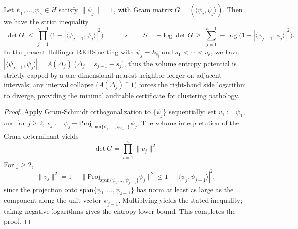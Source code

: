 \begin{proposition}\label{prop:xi-gram-det-nearest-neighbor-product-upper-bound}
Let \(\psi_1,\dots,\psi_\kappa\in H\) satisfy \(\|\psi_j\|=1\), with Gram matrix \(G=(\langle\psi_i,\psi_j\rangle)\).
Then we have the strict inequality
\[
\boxed{\;
\det G\ \le\ \prod_{j=1}^{\kappa-1}\bigl(1-|\langle\psi_{j+1},\psi_j\rangle|^2\bigr)\;}
\qquad
\Longrightarrow\qquad
S=-\log\det G\ \ge\ \sum_{j=1}^{\kappa-1}-\log\bigl(1-|\langle\psi_{j+1},\psi_j\rangle|^2\bigr).
\]
In the present Hellinger-RKHS setting with \(\psi_j=k_{s_j}\) and \(s_1<\cdots<s_\kappa\), we have \(|\langle\psi_{j+1},\psi_j\rangle|=A(\Delta_j)\) (\(\Delta_j=s_{j+1}-s_j\)), thus the volume entropy potential is strictly capped by a one-dimensional nearest-neighbor ledger on adjacent intervals; any interval collapse (\(A(\Delta_j)\uparrow 1\)) forces the right-hand side logarithm to diverge, providing the minimal auditable certificate for clustering pathology.
\end{proposition}
\begin{proof}
Apply Gram-Schmidt orthogonalization to \(\{\psi_j\}\) sequentially: set
\(
v_1:=\psi_1
\), and for \(j\ge 2\),
\(
v_j:=\psi_j-\mathrm{Proj}_{\mathrm{span}\{\psi_1,\dots,\psi_{j-1}\}}\psi_j
\).
The volume interpretation of the Gram determinant yields
\[
\det G=\prod_{j=1}^{\kappa}\|v_j\|^2.
\]
For \(j\ge 2\),
\[
\|v_j\|^2=1-\bigl\|\mathrm{Proj}_{\mathrm{span}\{\psi_1,\dots,\psi_{j-1}\}}\psi_j\bigr\|^2
\le 1-|\langle\psi_j,\psi_{j-1}\rangle|^2,
\]
since the projection onto \(\mathrm{span}\{\psi_1,\dots,\psi_{j-1}\}\) has norm at least as large as the component along the unit vector \(\psi_{j-1}\).
Multiplying yields the stated inequality; taking negative logarithms gives the entropy lower bound. This completes the proof.
\end{proof}
